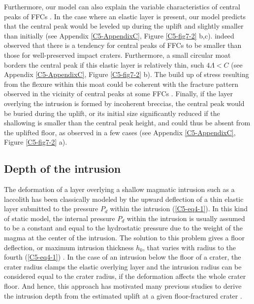 Furthermore, our  model can also explain  the variable characteristics
of central peaks of FFCs \citep{Schultz:1976kt}.  In the case where an
elastic layer  is present,  our model predicts  that the  central peak
would  be leveled  up  during  the uplift  and  slightly smaller  than
initially  (see  Appendix \ref{C5-AppendixC},  Figure  \ref{C5-fig7-2}
b,c).  \citet{Schultz:1976kt} indeed observed that there is a tendency
for central peaks of FFCs to  be smaller than those for well-preserved
impact  craters.   Furthermore,  a  small circular  moat  borders  the
central  peak  if   this  elastic  layer  is   relatively  thin,  such
$4\Lambda<C$ (see Appendix  \ref{C5-AppendixC}, Figure \ref{C5-fig7-2}
b). The build up of stress resulting from the flexure within this moat
could be coherent  with the fracture pattern observed  in the vicinity
of central peaks at some FFCs \citep{Schultz:1976kt}.  Finally, if the
layer overlying  the intrusion is  formed by incoherent  breccias, the
central peak  would be buried during  the uplift, or its  initial size
significantly reduced  if the shallowing  is smaller than  the central
peak height,  and could  thus be  absent from  the uplifted  floor, as
observed  in   a  few   cases  \citep{Schultz:1976kt}   (see  Appendix
\ref{C5-AppendixC}, Figure \ref{C5-fig7-2} a).
		 
\subsection{Depth of the intrusion}
\label{C5-Depth}		
The deformation of a layer overlying a shallow magmatic intrusion such
as a laccolith  has been classically modeled by  the upward deflection
of a thin  elastic layer submitted to the pressure  $P_{d}$ within the
intrusion  (\ref{C5-eq4-1}).   In  this  kind  of  static  model,  the
internal pressure $P_{d}$  within the intrusion is  usually assumed to
be a constant and equal to  the hydrostatic pressure due to the weight
of the  magma at the  center of the  intrusion.  The solution  to this
problem  gives  a floor  deflection,  or  maximum intrusion  thickness
$h_0$,  that  varies  with   radius  to  the  fourth  (\ref{C5-eq4-1})
\citep{Johnson:1973ho,Pollard:1973ho}.   In the  case of  an intrusion
below the  floor of  a crater,  the crater  radius clamps  the elastic
overlying layer  and the intrusion  radius can be considered  equal to
the  crater  radius,  if  the deformation  affects  the  whole  crater
floor. And hence, this approach has motivated many previous studies to
derive  the intrusion  depth  from  the estimated  uplift  at a  given
floor-fractured crater \citep{Wichman:1996bj,Jozwiak:2012dq}.
		
